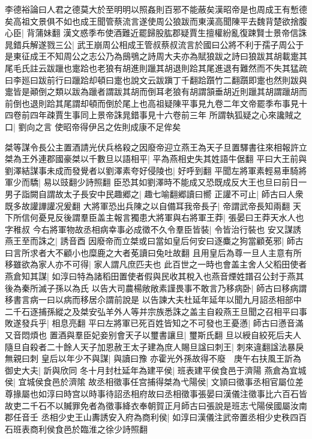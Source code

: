李德裕論曰人君之德莫大於至明明以照姦則百邪不能蔽矣漢昭帝是也周成王有慙德矣高祖文景俱不如也成王聞管蔡流言遂使周公狼跋而東漢高聞陳平去魏背楚欲捨腹心臣|{
	背蒲妹翻}
漢文惑季布使酒難近罷歸股肱郡疑賈生擅權紛亂復踈賢士景帝信誅晁錯兵解遂戮三公|{
	武王崩周公相成王管叔蔡叔流言於國曰公將不利于孺子周公于是東征成王不知周公之志公乃為䲭鴞之詩周大夫亦為賦狼跋之詩曰狼跋其胡載疐其尾毛氏註云跋躐也疐跲也老狼有胡進則躐其胡退則跲其尾進退有難然而不失其猛疏曰李廵曰跋前行曰躐跲却頓曰疐也說文云跋蹎丁千翻跲躓竹二翻躓即疐也然則跋與疐皆是顚倒之類以跋為躐者謂跋其胡而倒耳老狼有胡謂頷垂胡近則躐其胡謂躐胡而前倒也退則跲其尾謂却頓而倒於尾上也高祖疑陳平事見九卷二年文帝罷季布事見十四卷前四年疎賈生事同上景帝誅晁錯事見十六卷前三年}
所謂執狐疑之心來讒賊之口|{
	劉向之言}
使昭帝得伊呂之佐則成康不足侔矣

桀等謀令長公主置酒請光伏兵格殺之因廢帝迎立燕王為天子旦置驛書往來相報許立桀為王外連郡國豪桀以千數旦以語相平|{
	平為燕相史失其姓語牛倨翻}
平曰大王前與劉澤結謀事未成而發覺者以劉澤素夸好侵陵也|{
	好呼到翻}
平聞左將軍素輕易車騎將軍少而驕|{
	易以豉翻少詩照翻}
臣恐其如劉澤時不能成又恐既成反大王也旦曰前日一男子詣闕自謂故太子長安中民趣郷之|{
	趣七喻翻郷讀曰嚮}
正讙不可止|{
	師古曰人衆既多故讙譁讙况爰翻}
大將軍恐出兵陳之以自備耳我帝長子|{
	帝謂武帝長知兩翻}
天下所信何憂見反後謂羣臣盖主報言獨患大將軍與右將軍王莽|{
	張晏曰王莽天水人也字稚叔}
今右將軍物故丞相病幸事必成徵不久令羣臣皆裝|{
	令皆治行裝也}
安又謀誘燕王至而誅之|{
	誘音酉}
因廢帝而立桀或曰當如皇后何安曰逐麋之狗當顧莬邪|{
	師古曰言所求者大不顧小也糜鹿之大者莬讀曰兔吐故翻}
且用皇后為尊一旦人主意有所移雖欲為家人亦不可得|{
	家人謂凡庶匹夫也}
此百世之一時也會盖主舍人父稻田使者燕倉知其謀|{
	如淳曰特為諸稻田置使者假與民收其稅入也燕音煙姓譜召公封于燕其後為秦所滅子孫以為氏}
以告大司農楊敞敞素謹畏事不敢言乃移病卧|{
	師古曰移病謂移書言病一曰以病而移居尒謂前說是}
以告諫大夫杜延年延年以聞九月詔丞相部中二千石逐捕孫縱之及桀安弘羊外人等并宗族悉誅之盖主自殺燕王旦聞之召相平曰事敗遂發兵乎|{
	相息亮翻}
平曰左將軍已死百姓皆知之不可發也王憂懣|{
	師古曰懣音滿又音悶煩也}
置酒與羣臣妃妾别會天子以璽書讓旦|{
	璽斯氏翻}
旦以綬自絞死后夫人隨旦自殺者二十餘人天子加恩赦王太子建為庶人賜旦諡曰刺王|{
	刺來違翻諡法暴戾無親曰刺}
皇后以年少不與謀|{
	與讀曰豫}
亦霍光外孫故得不廢　庚午右扶風王訢為御史大夫|{
	訢與欣同}
冬十月封杜延年為建平侯|{
	班表建平侯食邑于濟陽}
燕倉為宜城侯|{
	宜城侯食邑於濟隂}
故丞相徵事任宫捕得桀為弋陽侯|{
	文頴曰徵事丞相官屬位差尊掾屬也如淳曰時宫以時事待詔丞相府故曰丞相徵事張晏曰漢儀注徵事比六百石皆故吏二千石不以贓罪免者為徵事絳衣奉朝賀正月師古曰張說是班志弋陽侯國屬汝南郡任音壬}
丞相少史王山夀誘安入府為商利侯|{
	如淳曰漢儀注武帝置丞相少史秩四百石班表商利侯食邑於臨淮之徐少詩照翻}
